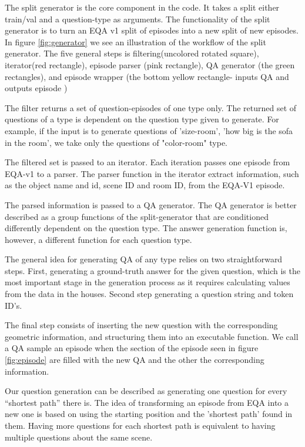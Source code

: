 The split generator is the core component in the code. It takes a split either train/val and a question-type as arguments. The functionality of the split generator is to turn an EQA v1 split of episodes into a new split of new episodes. In figure \ref{fig:generator} we see an illustration of the workflow of the split generator. The five general steps is filtering(uncolored rotated square), iterator(red rectangle), episode parser (pink rectangle),  QA generator (the green rectangles), and  episode wrapper (the bottom yellow rectangle- inputs QA and outputs episode )  

The filter returns a set of question-episodes of one type only. The returned set of questions of a type is dependent on the question type given to generate. For example, if the input is to generate questions of 'size-room', 'how big is the sofa in the room', we take only the questions of "color-room" type. 

The filtered set is passed to an iterator. Each iteration passes one episode from EQA-v1 to a parser. The parser function in the iterator extract information, such as the object name and id, scene ID and room ID, from the EQA-V1 episode. 

The parsed information is passed to a QA generator. The QA generator is better described  as a group functions of the split-generator that are conditioned differently dependent on the question type. The answer generation function is, however, a different function for each question type.  

 The general idea for generating QA of any type relies on two straightforward steps. First, generating a ground-truth answer for the given question, which is the most important stage in the generation process as it requires calculating values from the data in the houses. Second step generating a question string and token ID's.

The  final step consists of inserting the new question with the corresponding geometric information, and structuring them into an executable function.  We call a QA sample an episode when the section of the episode seen in figure \ref{fig:episode} are filled with the new QA and the other the corresponding information. 

Our question generation can be described as generating one question for every “shortest path” there is. The idea of transforming  an episode from EQA into a new one is based on using the starting position and the 'shortest path' found in them. Having more questions for each shortest path is equivalent to having multiple questions about the same scene. 

